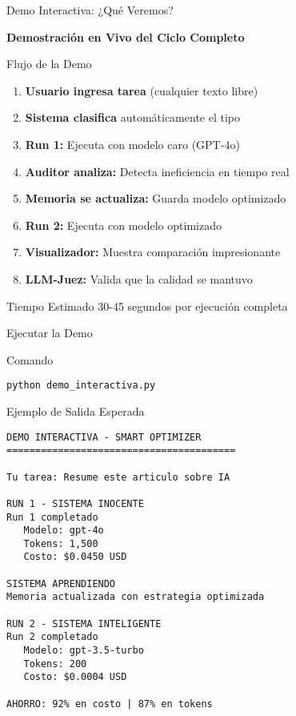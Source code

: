 \documentclass[aspectratio=169,11pt]{beamer}
\begin{document}
\begin{frame}{Demo Interactiva: ¿Qué Veremos?}
\begin{center}
\Large \textbf{Demostración en Vivo del Ciclo Completo}
\end{center}

\vspace{0.5cm}

\begin{block}{Flujo de la Demo}
\begin{enumerate}
    \item \textbf{Usuario ingresa tarea} (cualquier texto libre)
    \item \textbf{Sistema clasifica} automáticamente el tipo
    \item \textbf{Run 1:} Ejecuta con modelo caro (GPT-4o)
    \item \textbf{Auditor analiza:} Detecta ineficiencia en tiempo real
    \item \textbf{Memoria se actualiza:} Guarda modelo optimizado
    \item \textbf{Run 2:} Ejecuta con modelo optimizado
    \item \textbf{Visualizador:} Muestra comparación impresionante
    \item \textbf{LLM-Juez:} Valida que la calidad se mantuvo
\end{enumerate}
\end{block}

\vspace{0.3cm}

\begin{alertblock}{Tiempo Estimado}
30-45 segundos por ejecución completa
\end{alertblock}
\end{frame}

\begin{frame}[fragile]{Ejecutar la Demo}
\begin{block}{Comando}
\begin{verbatim}
python demo_interactiva.py
\end{verbatim}
\end{block}

\vspace{0.3cm}

\begin{exampleblock}{Ejemplo de Salida Esperada}
\tiny
\begin{verbatim}
DEMO INTERACTIVA - SMART OPTIMIZER
========================================

Tu tarea: Resume este articulo sobre IA

RUN 1 - SISTEMA INOCENTE
Run 1 completado
   Modelo: gpt-4o
   Tokens: 1,500
   Costo: $0.0450 USD

SISTEMA APRENDIENDO
Memoria actualizada con estrategia optimizada

RUN 2 - SISTEMA INTELIGENTE
Run 2 completado
   Modelo: gpt-3.5-turbo
   Tokens: 200
   Costo: $0.0004 USD

AHORRO: 92% en costo | 87% en tokens
\end{verbatim}
\end{exampleblock}
\end{frame}
\end{document}
